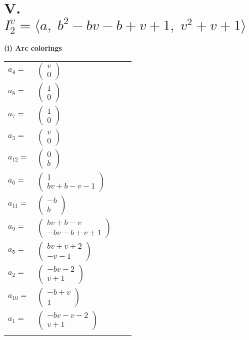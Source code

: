 \documentclass[1p]{elsarticle_modified}
\theoremstyle{definition}
\begin{document}
\centering \section*{V. $I^v_{2}= \langle a,\;b^2- b v- b+v+1,\;v^2+v+1 \rangle$}
\flushleft \textbf{(i) Arc colorings}\\
\begin{tabular}{m{7pt} m{180pt} m{7pt} m{180pt} }
\flushright $a_{4}=$&$\begin{pmatrix}v\\0\end{pmatrix}$ \\
\flushright $a_{8}=$&$\begin{pmatrix}1\\0\end{pmatrix}$ \\
\flushright $a_{7}=$&$\begin{pmatrix}1\\0\end{pmatrix}$ \\
\flushright $a_{3}=$&$\begin{pmatrix}v\\0\end{pmatrix}$ \\
\flushright $a_{12}=$&$\begin{pmatrix}0\\b\end{pmatrix}$ \\
\flushright $a_{6}=$&$\begin{pmatrix}1\\b v+b- v-1\end{pmatrix}$ \\
\flushright $a_{11}=$&$\begin{pmatrix}- b\\b\end{pmatrix}$ \\
\flushright $a_{9}=$&$\begin{pmatrix}b v+b- v\\- b v- b+v+1\end{pmatrix}$ \\
\flushright $a_{5}=$&$\begin{pmatrix}b v+v+2\\- v-1\end{pmatrix}$ \\
\flushright $a_{2}=$&$\begin{pmatrix}- b v-2\\v+1\end{pmatrix}$ \\
\flushright $a_{10}=$&$\begin{pmatrix}- b+v\\1\end{pmatrix}$ \\
\flushright $a_{1}=$&$\begin{pmatrix}- b v- v-2\\v+1\end{pmatrix}$\\&\end{tabular}
\end{document}

